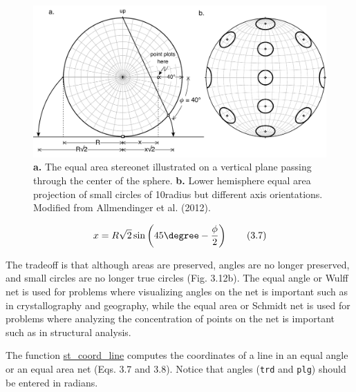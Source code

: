 \documentclass[a4paper , 12pt]{book}
\newcommand{\code}[1]{\colorbox{light-gray}{\texttt{#1}}}
\begin{document}
\begin{figure}[ht]
    \centering
    \includegraphics[width=13cm]{ch3f12.pdf}
    \caption{ \textbf{a.} The equal area stereonet illustrated on a vertical plane passing through the center of the sphere. \textbf{b.} Lower hemisphere equal area projection of small circles of 10\degree\space radius but different axis orientations. Modified from Allmendinger et al. (2012).}
\end{figure}

\begin{equation}
    x = R\sqrt{2}\sin\left(45\degree-\frac{\phi}{2}\right) \tag{3.7}
\end{equation}

The tradeoff is that although areas are preserved, angles are no longer preserved, and small circles are no longer true circles (Fig. 3.12b). The equal angle or Wulff net is used for problems where visualizing angles on the net is important such as in crystallography and geography, while the equal area or Schmidt net is used for problems where analyzing the concentration of points on the net is important such as in structural analysis.

The function \href{https://github.com/nfcd/compGeo/blob/master/source/functions/st_coord_line.py}{st\_coord\_line} computes the coordinates of a line in an equal angle or an equal area net (Eqs. 3.7 and 3.8).  Notice that angles (\code{trd} and \code{plg}) should be entered in radians.
\end{document}
